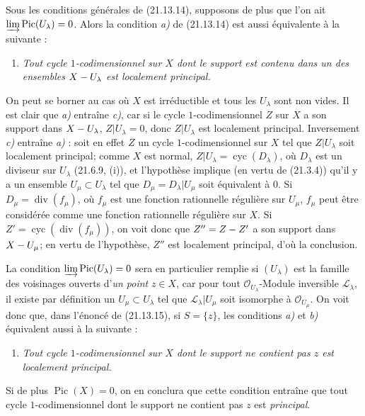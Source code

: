 \begin{remark}[21.13.16]
\label{IV.21.13.16}
Sous les conditions générales de (21.13.14), supposons de plus que l'on ait
$\varinjlim\operatorname{Pic}(U_\lambda)=0$. Alors la condition \emph{a)} de (21.13.14)
est aussi équivalente à la suivante :
\begin{enumerate}
  \item[c)] \emph{Tout cycle $1$-codimensionnel sur $X$ dont le support est contenu
  dans un des ensembles $X- U_\lambda$ est localement principal.}
\end{enumerate}

On peut se borner au cas où $X$ est irréductible et tous les $U_\lambda$ sont non
vides. Il est clair que \emph{a)} entraîne \emph{c)}, car si le cycle $1$-codimensionnel $Z$ sur
$X$ a son support dans $X- U_\lambda$, $Z|U_\lambda=0$, donc $Z|U_\lambda$ est
localement principal. Inversement \emph{c)} entraîne \emph{a)} : soit en effet $Z$ un cycle
$1$-codimensionnel sur $X$ tel que $Z|U_\lambda$ soit localement principal; comme $X$
est normal, $Z|U_\lambda=\operatorname{cyc}(D_\lambda)$, où $D_\lambda$ est un
diviseur sur $U_\lambda$ (21.6.9, (i)), et l'hypothèse implique (en vertu de
(21.3.4)) qu'il y a un ensemble $U_\mu\subset U_\lambda$ tel que
$D_\mu=D_\lambda|U_\mu$ soit équivalent à $0$. Si
$D_\mu=\operatorname{div}(f_\mu)$, où $f_\mu$ est une fonction rationnelle régulière
sur $U_\mu$, $f_\mu$ peut être considérée comme une fonction rationnelle régulière
sur $X$. Si $Z'=\operatorname{cyc}(\operatorname{div}(f_\mu))$, on voit donc que
$Z''=Z- Z'$ a son support dans $X- U_\mu$; en vertu de l'hypothèse, $Z''$ est
localement principal, d'où la conclusion.

La condition $\varinjlim\operatorname{Pic}(U_\lambda)=0$ sera en particulier remplie
si $(U_\lambda)$ est la famille des voisinages ouverts d'\emph{un point} $z\in X$,
car pour tout $\mathcal O_{U_\lambda}$-Module inversible $\mathscr L_\lambda$, il
existe par définition un $U_\mu\subset U_\lambda$ tel que
$\mathscr L_\lambda|U_\mu$ soit isomorphe à $\mathcal O_{U_\mu}$. On voit donc que,
dans l'énoncé de (21.13.15), si $S=\{z\}$, les conditions \emph{a)} et \emph{b)} équivalent
aussi à la suivante :
\begin{enumerate}
  \item[c)] \emph{Tout cycle $1$-codimensionnel sur $X$ dont le support ne contient
  pas $z$ est localement principal.}
\end{enumerate}

Si de plus $\operatorname{Pic}(X)=0$, on en conclura que cette condition entraîne que
tout cycle $1$-codimensionnel dont le support ne contient pas $z$ est \emph{principal}.
\end{remark}

